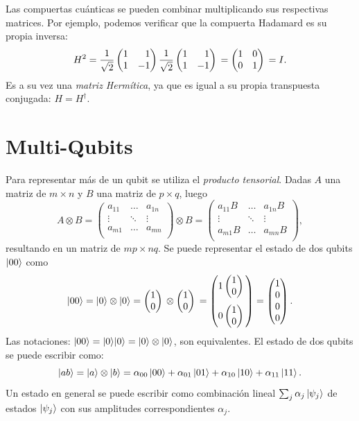 Las compuertas cuánticas se pueden combinar multiplicando sus respectivas matrices. Por ejemplo,
podemos verificar que la compuerta Hadamard es su propia inversa:
\begin{equation}
  H^2 = \hgate{} \hgate{} = \igate{} = I.
\end{equation}
Es a su vez una \emph{matriz Hermítica}, ya que es igual a su propia transpuesta conjugada: $H = H^\dagger$.

\section{Multi-Qubits}
Para representar más de un qubit se utiliza el \emph{producto tensorial}. Dadas $A$ una matriz de  $m \times n$ y $B$ una matriz de $p \times q$, luego
\begin{equation}
  A \otimes B = \begin{pmatrix}
      a_{11} & \dots & a_{1n} \\
      \vdots & \ddots & \vdots \\
      a_{m1} & \dots & a_{mn} \\
    \end{pmatrix} \otimes B =
    \begin{pmatrix}
      a_{11}B & \dots & a_{1n}B \\
      \vdots & \ddots & \vdots \\
      a_{m1}B & \dots & a_{mn}B \\
    \end{pmatrix},
\end{equation}
resultando en un matriz de $mp \times nq$.
Se puede representar el estado de dos qubits $\ket{00}$ como
\begin{equation}
  \ket{00} = \ket{0} \otimes \ket{0} = \begin{pmatrix}1 \\ 0\end{pmatrix}{} \otimes \begin{pmatrix}1 \\ 0\end{pmatrix}{} =
  \begin{pmatrix}
    1\begin{pmatrix}1 \\ 0\end{pmatrix}{} \\[13pt]
    0\begin{pmatrix}1 \\ 0\end{pmatrix}{}
  \end{pmatrix}
  =
  \begin{pmatrix}
    1 \\
    0 \\
    0 \\
    0
  \end{pmatrix}.
\end{equation}
Las notaciones: $\ket{00} = \ket{0}\!\ket{0} = \ket{0} \otimes \ket{0}$, son equivalentes.
El estado de dos qubits se puede escribir como:
\begin{equation}
  \ket{ab} = \ket{a} \otimes \ket{b} = \alpha_{00}\ket{00} + \alpha_{01}\ket{01} + \alpha_{10}\ket{10} + \alpha_{11}\ket{11}.
\end{equation}
Un estado en general se puede escribir como combinación lineal $\sum_{j} \alpha_j\ket{\psi_j}$ de estados $\ket{\psi_j}$ con sus amplitudes correspondientes $\alpha_j$.

